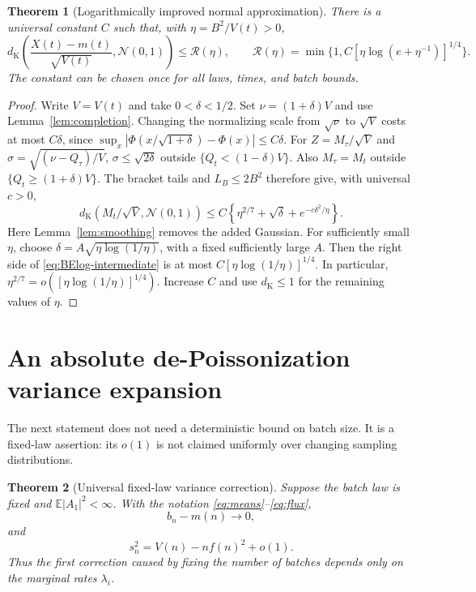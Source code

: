 \documentclass[11pt]{article}
\numberwithin{equation}{section}
\newtheorem{theorem}{Theorem}[section]
\theoremstyle{definition}
\theoremstyle{remark}
\newcommand{\E}{\mathbb E}
\newcommand{\dK}{d_{\mathrm K}}
\newcommand{\Normal}{\mathcal N(0,1)}
\begin{document}
\begin{theorem}[Logarithmically improved normal approximation]\label{thm:BElog}
There is a universal constant $C$ such that, with $\eta=B^2/V(t)>0$,
\begin{equation}\label{eq:BElog}
 \dK\left(\frac{X(t)-m(t)}{\sqrt{V(t)}},\Normal\right)
 \le \mathcal R(\eta),\qquad
 \mathcal R(\eta)=\min\{1,C[\eta\log(e+\eta^{-1})]^{1/4}\}.
\end{equation}
The constant can be chosen once for all laws, times, and batch bounds.
\end{theorem}
\begin{proof}
Write $V=V(t)$ and take $0<\delta<1/2$. Set $\nu=(1+\delta)V$ and use
Lemma~\ref{lem:completion}. Changing the normalizing scale from $\sqrt\nu$
to $\sqrt V$ costs at most $C\delta$, since
$\sup_x|\Phi(x/\sqrt{1+\delta})-\Phi(x)|\le C\delta$.
For $Z=M_\tau/\sqrt V$ and $\sigma=\sqrt{(\nu-Q_\tau)/V}$,
$\sigma\le\sqrt{2\delta}$ outside $\{Q_t<(1-\delta)V\}$.
Also $M_\tau=M_t$ outside $\{Q_t\ge(1+\delta)V\}$.
The bracket tails and $L_B\le2B^2$ therefore give, with universal $c>0$,
\begin{equation}\label{eq:BElog-intermediate}
 \dK(M_t/\sqrt V,\Normal)
 \le C\left\{\eta^{2/7}+\sqrt\delta+
                      e^{-c\delta^2/\eta}\right\}.
\end{equation}
Here Lemma~\ref{lem:smoothing} removes the added Gaussian. For sufficiently
small $\eta$, choose $\delta=A\sqrt{\eta\log(1/\eta)}$, with a fixed
sufficiently large $A$. Then the right side of
\eqref{eq:BElog-intermediate} is at most
$C[\eta\log(1/\eta)]^{1/4}$. In particular,
$\eta^{2/7}=o([\eta\log(1/\eta)]^{1/4})$.
Increase $C$ and use $\dK\le1$ for the remaining values of $\eta$.
\end{proof}

\section{An absolute de-Poissonization variance expansion}\label{sec:correction}

The next statement does not need a deterministic bound on batch size.
It is a fixed-law assertion: its $o(1)$ is not claimed uniformly over changing
sampling distributions.

\begin{theorem}[Universal fixed-law variance correction]\label{thm:correction}
Suppose the batch law is fixed and $\E|A_1|^2<\infty$. With the notation
\eqref{eq:means}--\eqref{eq:flux},
\begin{equation}\label{eq:meancorrection}
 b_n-m(n)\longrightarrow0,
\end{equation}
and
\begin{equation}\label{eq:variancecorrection}
 s_n^2=V(n)-nf(n)^2+o(1).
\end{equation}
Thus the first correction caused by fixing the number of batches depends
only on the marginal rates $\lambda_i$.
\end{theorem}
\end{document}
